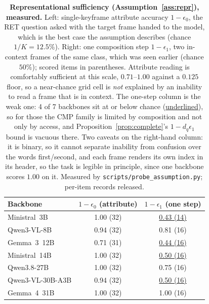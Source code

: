 \documentclass[10pt]{article}
\theoremstyle{definition}
\theoremstyle{plain}
\begin{document}
\begin{table}[!t]
\centering\small
\caption{\textbf{Representational sufficiency (Assumption~\ref{ass:repr}), measured.} Left: single-keyframe attribute accuracy $1-\epsilon_0$, the RET question asked with the target frame handed to the model, which is the best case the assumption describes (chance $1/K=12.5\%$). Right: one composition step $1-\epsilon_1$, two in-context frames of the same class, which was seen earlier (chance $50\%$); scored items in parentheses. Attribute reading is comfortably sufficient at this scale, $0.71$--$1.00$ against a $0.125$ floor, so a near-chance grid cell is \emph{not} explained by an inability to read a frame that is in context. The one-step column is the weak one: 4 of 7 backbones sit at or below chance (\underline{underlined}), so for those the CMP family is limited by composition and not only by access, and Proposition~\ref{prop:complete}'s $1-d_q\epsilon_1$ bound is vacuous there. Two caveats on the right-hand column: it is binary, so it cannot separate inability from confusion over the words \textsf{first}/\textsf{second}, and each frame renders its own index in its header, so the task is legible in principle, since one backbone scores $1.00$ on it. Measured by \texttt{scripts/probe\_assumption.py}; per-item records released.}
\label{tab:probe}
\begin{tabular}{lcc}
\toprule
Backbone & $1-\epsilon_0$ (attribute) & $1-\epsilon_1$ (one step) \\
\midrule
Ministral~3B & 1.00 (32) & \underline{0.43 (14)} \\
Qwen3-VL-8B & 0.94 (32) & 0.81 (16) \\
Gemma~3~12B & 0.71 (31) & \underline{0.44 (16)} \\
Ministral~14B & 1.00 (32) & \underline{0.50 (16)} \\
Qwen3.8-27B & 1.00 (32) & 0.75 (16) \\
Qwen3-VL-30B-A3B & 0.94 (32) & \underline{0.50 (16)} \\
Gemma~4~31B & 1.00 (32) & 1.00 (16) \\
\bottomrule
\end{tabular}
\end{table}
\end{document}
